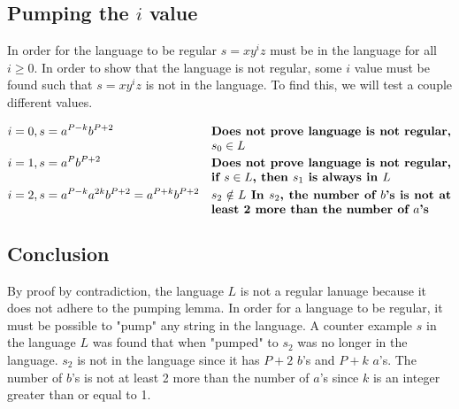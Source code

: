 \documentclass{assignment-x}
\begin{document}
\subsection{Pumping the $i$ value}
In order for the language to be regular $s=xy^iz$ must be in the language for all $i \geq 0$. In order to show that the language is not regular, some $i$ value must be found such that $s=xy^iz$ is not in the language. To find this, we will test a couple different values.

\begin{align*}
    \proofline{i=0, s = a^{P-k}b^{P+2}}{Does not prove language is not regular, $s_0 \in L$}
    \proofline{i=1, s = a^Pb^{P+2}}{Does not prove language is not regular, if $s \in L$, then $s_1$ is always in $L$}
    \proofline{i=2, s = a^{P-k}a^{2k}b^{P+2} = a^{P+k}b^{P+2}}{$s_2 \notin L$ In $s_2$, the number of $b$'s is not at least 2 more than the number of $a$'s }
\end{align*}

\subsection{Conclusion}
By proof by contradiction, the language $L$ is not a regular lanuage because it does not adhere to the pumping lemma. In order for a language to be regular, it must be possible to "pump" any string in the language. A counter example $s$ in the language $L$ was found that when "pumped"  to $s_2$ was no longer in the language. $s_2$ is not in the language since it has $P+2$ $b$'s and $P+k$ $a$'s. The number of $b$'s is not at least 2 more than the number of $a$'s since $k$ is an integer greater than or equal to 1.
\end{document}
